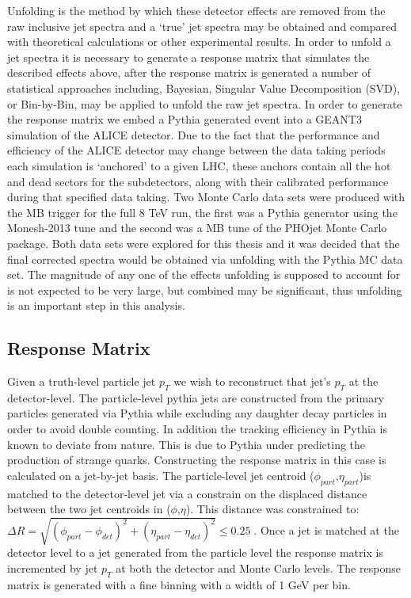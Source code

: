 \noindent
Unfolding is the method by which these detector effects are removed from the raw inclusive jet spectra and a `true' jet spectra may be obtained and compared with theoretical calculations or other experimental results.  In order to unfold a jet spectra it is necessary to generate a response matrix that simulates the described effects above, after the response matrix is generated a number of statistical approaches including, Bayesian, Singular Value Decomposition (SVD), or Bin-by-Bin, may be applied to unfold the raw jet spectra.  In order to generate the response matrix we embed a Pythia generated event into a GEANT3 simulation of the ALICE detector.  Due to the fact that the performance and efficiency of the ALICE detector may change between the data taking periods each simulation is `anchored' to a given LHC, these anchors contain all the hot and dead sectors for the subdetectors, along with their calibrated performance during that specified data taking.  Two Monte Carlo data sets were produced with the MB trigger for the full 8 TeV run, the first was a Pythia generator using the Monesh-2013 tune and the second was a MB tune of the PHOjet Monte Carlo package.  Both data sets were explored for this thesis and it was decided that the final corrected spectra would be obtained via unfolding with the Pythia MC data set.  The magnitude of any one of the effects unfolding is supposed to account for is not expected to be very large, but combined may be significant, thus unfolding is an important step in this analysis.

\subsection{Response Matrix}
Given a truth-level particle jet $p_{T}$ we wish to reconstruct that jet's $p_{T}$ at the detector-level.  The particle-level pythia jets are constructed from the primary particles generated via Pythia while excluding any daughter decay particles in order to avoid double counting.  In addition the tracking efficiency in Pythia is known to deviate from nature.  This is due to Pythia under predicting the production of strange quarks.  
Constructing the response matrix in this case is calculated on a jet-by-jet basis.  The particle-level jet centroid ($\phi_{part}$,$\eta_{part}$)is matched to the detector-level jet via a constrain on the displaced distance between the two jet centroids in ($\phi$,$\eta$).  This distance was constrained to: $\Delta  R = \sqrt{(\phi_{part} - \phi_{det})^{2} + (\eta_{part} - \eta_{det})^{2}} \leq 0.25 \; $.  Once a jet is matched at the detector level to a jet generated from the particle level the response matrix is incremented by jet $p_{T}$ at both the detector and Monte Carlo levels.  The response matrix is generated with a fine binning with a width of 1 GeV per bin. 

